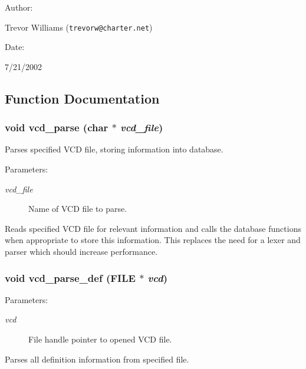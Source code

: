 \begin{Desc}
\item[Author: ]\par
Trevor Williams ({\tt trevorw@charter.net}) \end{Desc}
\begin{Desc}
\item[Date: ]\par
7/21/2002\end{Desc}


\subsection{Function Documentation}
\subsubsection{\setlength{\rightskip}{0pt plus 5cm}void vcd\_\-parse (char $\ast$ {\em vcd\_\-file})}\label{vcd_8c_a7}


Parses specified VCD file, storing information into database.

\begin{Desc}
\item[Parameters: ]\par
\begin{description}
\item[{\em 
vcd\_\-file}]Name of VCD file to parse.\end{description}
\end{Desc}
Reads specified VCD file for relevant information and calls the database functions when appropriate to store this information. This replaces the need for a lexer and parser which should increase performance. 
\subsubsection{\setlength{\rightskip}{0pt plus 5cm}void vcd\_\-parse\_\-def (FILE $\ast$ {\em vcd})}\label{vcd_8c_a4}


\begin{Desc}
\item[Parameters: ]\par
\begin{description}
\item[{\em 
vcd}]File handle pointer to opened VCD file.\end{description}
\end{Desc}
Parses all definition information from specified file. 
